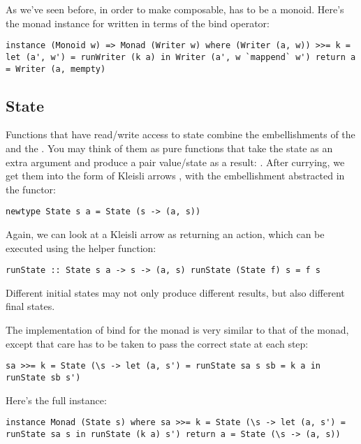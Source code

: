 As we've seen before, in order to make  composable,
 has to be a monoid. Here's the monad instance for
 written in terms of the bind operator:

\begin{verbatim}
instance (Monoid w) => Monad (Writer w) where (Writer (a, w)) >>= k = let (a', w') = runWriter (k a) in Writer (a', w `mappend` w') return a = Writer (a, mempty)
\end{verbatim}

\subsection{State}\label{state}

Functions that have read/write access to state combine the
embellishments of the  and the . You may
think of them as pure functions that take the state as an extra argument
and produce a pair value/state as a result:
. After currying, we get them
into the form of Kleisli arrows
, with the
embellishment abstracted in the  functor:

\begin{verbatim}
newtype State s a = State (s -> (a, s))
\end{verbatim}

Again, we can look at a Kleisli arrow as returning an action, which can
be executed using the helper function:

\begin{verbatim}
runState :: State s a -> s -> (a, s) runState (State f) s = f s
\end{verbatim}

Different initial states may not only produce different results, but
also different final states.

The implementation of bind for the  monad is very similar
to that of the  monad, except that care has to be taken
to pass the correct state at each step:

\begin{verbatim}
sa >>= k = State (\s -> let (a, s') = runState sa s sb = k a in runState sb s')
\end{verbatim}

Here's the full instance:

\begin{verbatim}
instance Monad (State s) where sa >>= k = State (\s -> let (a, s') = runState sa s in runState (k a) s') return a = State (\s -> (a, s))
\end{verbatim}

